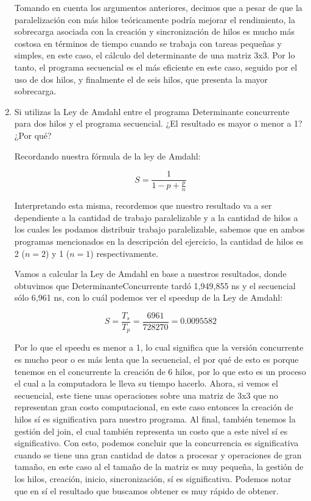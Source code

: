 \begin{enumerate}
Tomando en cuenta los argumentos anteriores, decimos que a pesar de que la paralelización con más hilos teóricamente podría mejorar el rendimiento, la sobrecarga asociada con la creación y sincronización de hilos es mucho más costosa en términos de tiempo cuando se trabaja con tareas pequeñas y simples, en este caso, el cálculo del determinante de una matriz 3x3. Por lo tanto, el programa secuencial es el más eficiente en este caso, seguido por el uso de dos hilos, y finalmente el de seis hilos, que presenta la mayor sobrecarga.


    \hfill    
    
    \item Si utilizas la Ley de Amdahl entre el programa Determinante concurrente para dos hilos y el programa secuencial. ¿El resultado es mayor o menor a 1? ¿Por qué?

    Recordando nuestra fórmula de la ley de Amdahl:

    \[ S = \frac{1}{1-p + \frac{p}{n}}\]

    Interpretando esta misma, recordemos que nuestro resultado va a ser dependiente a la cantidad de trabajo paralelizable y a la cantidad de hilos a los cuales les podamos distribuir trabajo paralelizable, sabemos que en ambos programas mencionados en la descripción del ejercicio, la cantidad de hilos es 2 ($n=2$) y 1 ($n=1$) respectivamente.

    Vamos a calcular la Ley de Amdahl en base a nuestros resultados, donde obtuvimos que DeterminanteConcurrente tardó 1,949,855 ns y el secuencial sólo 6,961 ns, con lo cuál
    podemos ver el speedup de la Ley de Amdahl:

    \[S = \frac{T_s}{T_p}=\frac{6961}{728270}=0.0095582\]

    Por lo que el speedu es menor a 1, lo cual significa que la versión concurrente es mucho peor o es más lenta que la secuencial, el por qué de esto es porque tenemos en el concurrente la creación de 6 hilos, por lo que esto es un proceso el cual a la computadora le lleva su tiempo hacerlo. Ahora, si vemos el secuencial, este tiene unas operaciones sobre una matriz de 3x3 que no representan gran costo computacional, en este caso entonces la creación de hilos sí es significativa para nuestro programa.
    Al final, también tenemos la gestión del join, el cual también representa un costo que a este nivel sí es significativo.
    Con esto, podemos concluir que la concurrencia es significativa cuando se tiene una gran cantidad de datos a procesar y operaciones de gran tamaño, en este caso al el tamaño
    de la matriz es muy pequeña, la gestión de los hilos, creación, inicio, sincronización, sí es significativa.
    Podemos notar que en sí el resultado que buscamos obtener es muy rápido de obtener.


\end{enumerate}

